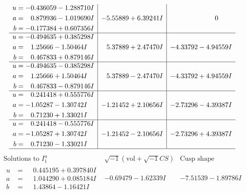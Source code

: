 \documentclass[1p]{elsarticle_modified}
\theoremstyle{definition}
\newcommand{\I}{\sqrt{-1}}
\begin{document}
$$\begin{array}{c|c|c}
\begin{aligned}
u &= -0.436059 - 1.288710 I \\
a &= \phantom{-}0.879936 - 1.019690 I \\
b &= -0.177384 + 0.607356 I\end{aligned}
 & -5.55889 + 6.39241 I & \phantom{-0.000000 } 0 \\ \hline\begin{aligned}
u &= -0.494635 + 0.385298 I \\
a &= \phantom{-}1.25666 - 1.50464 I \\
b &= \phantom{-}0.467833 + 0.879146 I\end{aligned}
 & \phantom{-}5.37889 + 2.47470 I & -4.33792 - 4.94559 I \\ \hline\begin{aligned}
u &= -0.494635 - 0.385298 I \\
a &= \phantom{-}1.25666 + 1.50464 I \\
b &= \phantom{-}0.467833 - 0.879146 I\end{aligned}
 & \phantom{-}5.37889 - 2.47470 I & -4.33792 + 4.94559 I \\ \hline\begin{aligned}
u &= \phantom{-}0.241418 + 0.555776 I \\
a &= -1.05287 - 1.30742 I \\
b &= \phantom{-}0.71230 + 1.33021 I\end{aligned}
 & -1.21452 + 2.10656 I & -2.73296 - 4.39387 I \\ \hline\begin{aligned}
u &= \phantom{-}0.241418 - 0.555776 I \\
a &= -1.05287 + 1.30742 I \\
b &= \phantom{-}0.71230 - 1.33021 I\end{aligned}
 & -1.21452 - 2.10656 I & -2.73296 + 4.39387 I\\
 \hline 
 \end{array}$$\newpage$$\begin{array}{c|c|c}  
\text{Solutions to }I^u_{1}& \I (\text{vol} + \sqrt{-1}CS) & \text{Cusp shape}\\
 \hline 
\begin{aligned}
u &= \phantom{-}0.445195 + 0.397840 I \\
a &= \phantom{-}1.044290 + 0.085184 I \\
b &= \phantom{-}1.43864 - 1.16421 I\end{aligned}
 & -0.69479 - 1.62339 I & -7.51539 - 1.89786 I \\ \hline\begin{aligned}

\end{aligned}
\end{array}$$
\end{document}
